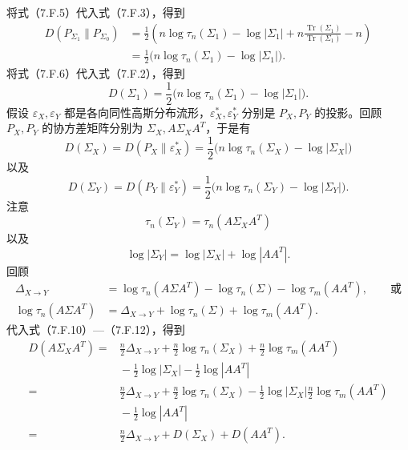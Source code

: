 将式（7.F.5）代入式（7.F.3），得到
\begin{equation}
\begin{aligned}
D(P_{\Sigma_1}\parallel P_{\Sigma_0})
 &=\frac12\left(n\log\tau_n(\Sigma_1)-\log|\Sigma_1|
  +n\frac{\operatorname{Tr}(\Sigma_1)}{\operatorname{Tr}(\Sigma_1)}-n\right)\\
 &=\frac12\bigl(n\log\tau_n(\Sigma_1)-\log|\Sigma_1|\bigr).
\end{aligned}\tag{7.F.6}
\end{equation}
将式（7.F.6）代入式（7.F.2），得到
\begin{equation}
D(\Sigma_1)=\frac12\bigl(n\log\tau_n(\Sigma_1)-\log|\Sigma_1|\bigr).\tag{7.F.7}
\end{equation}
假设 $\varepsilon_X,\varepsilon_Y$ 都是各向同性高斯分布流形，$\varepsilon_X^*,\varepsilon_Y^*$ 分别是 $P_X,P_Y$ 的投影。回顾 $P_X,P_Y$ 的协方差矩阵分别为 $\Sigma_X,A\Sigma_XA^T$，于是有
\begin{equation}
D(\Sigma_X)=D(P_X\parallel\varepsilon_X^*)
 =\frac12\bigl(n\log\tau_n(\Sigma_X)-\log|\Sigma_X|\bigr)\tag{7.F.8}
\end{equation}
以及
\begin{equation}
D(\Sigma_Y)=D(P_Y\parallel\varepsilon_Y^*)
 =\frac12\bigl(n\log\tau_n(\Sigma_Y)-\log|\Sigma_Y|\bigr).\tag{7.F.9}
\end{equation}
注意
\begin{equation}
\tau_n(\Sigma_Y)=\tau_n(A\Sigma_XA^T)\tag{7.F.10}
\end{equation}
以及
\begin{equation}
\log|\Sigma_Y|=\log|\Sigma_X|+\log|AA^T|.\tag{7.F.11}
\end{equation}
回顾
\begin{equation}
\begin{aligned}
\Delta_{X\to Y}&=\log\tau_n(A\Sigma A^T)-\log\tau_n(\Sigma)
 -\log\tau_m(AA^T),\qquad\text{或}\\
\log\tau_n(A\Sigma A^T)&=\Delta_{X\to Y}+\log\tau_n(\Sigma)+\log\tau_m(AA^T).
\end{aligned}\tag{7.F.12}
\end{equation}
代入式（7.F.10）—（7.F.12），得到
\begin{equation}
\begin{aligned}
D(A\Sigma_XA^T)
={}&\frac n2\Delta_{X\to Y}+\frac n2\log\tau_n(\Sigma_X)
 +\frac n2\log\tau_m(AA^T)\\
&{}-\frac12\log|\Sigma_X|-\frac12\log|AA^T|\\
={}&\frac n2\Delta_{X\to Y}+\frac n2\log\tau_n(\Sigma_X)
 -\frac12\log|\Sigma_X|\frac n2\log\tau_m(AA^T)\\
&{}-\frac12\log|AA^T|\\
={}&\frac n2\Delta_{X\to Y}+D(\Sigma_X)+D(AA^T).
\end{aligned}\tag{7.F.13}
\end{equation}

